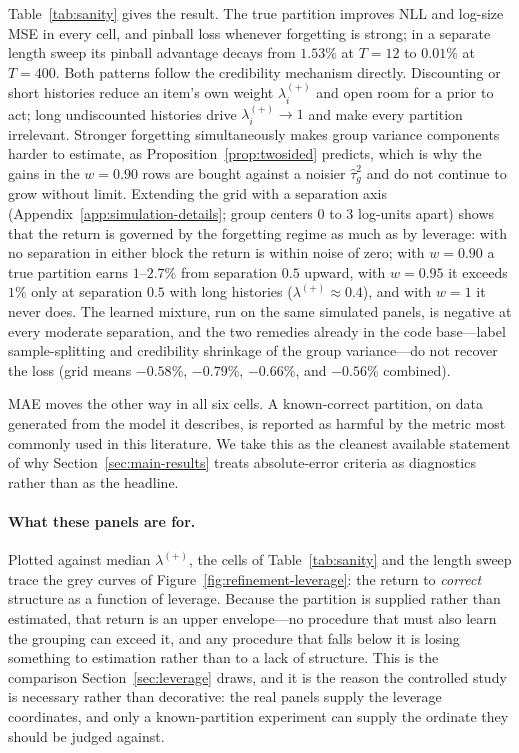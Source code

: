 Table~\ref{tab:sanity} gives the result. The true partition improves NLL
and log-size MSE in every cell, and pinball loss whenever forgetting is
strong; in a separate length sweep its pinball advantage decays from
$1.53\%$ at $T=12$ to $0.01\%$ at $T=400$. Both patterns follow the
credibility mechanism directly. Discounting or short histories reduce an
item's own weight $\lambda^{(+)}_i$ and open room for a prior to act;
long undiscounted histories drive $\lambda^{(+)}_i\to1$ and make every
partition irrelevant. Stronger forgetting simultaneously makes group
variance components harder to estimate, as
Proposition~\ref{prop:twosided} predicts, which is why the gains in the
$w=0.90$ rows are bought against a noisier $\hat\tau_g^2$ and do not
continue to grow without limit. Extending the grid with a separation axis
(Appendix~\ref{app:simulation-details}; group centers $0$ to $3$
log-units apart) shows that the return is governed by the forgetting
regime as much as by leverage: with no separation in either block the return is within noise of
zero; with $w=0.90$ a true partition earns $1$--$2.7\%$ from separation
$0.5$ upward, with $w=0.95$ it exceeds $1\%$ only at separation $0.5$
with long histories ($\lambda^{(+)}\approx0.4$), and with $w=1$ it never
does. The learned mixture, run on the same simulated panels, is negative
at every moderate separation, and the two remedies already in the code
base---label sample-splitting and credibility shrinkage of the group
variance---do not recover the loss (grid means $-0.58\%$, $-0.79\%$, $-0.66\%$, and $-0.56\%$ combined).

MAE moves the other way in all six cells. A known-correct partition, on
data generated from the model it describes, is reported as harmful by the
metric most commonly used in this literature. We take this as the cleanest
available statement of why Section~\ref{sec:main-results} treats
absolute-error criteria as diagnostics rather than as the headline.

\paragraph{What these panels are for.}
Plotted against median $\lambda^{(+)}$, the cells of
Table~\ref{tab:sanity} and the length sweep trace the grey curves of
Figure~\ref{fig:refinement-leverage}: the return to \emph{correct}
structure as a function of leverage. Because the partition is supplied
rather than estimated, that return is an upper envelope---no procedure
that must also learn the grouping can exceed it, and any procedure that
falls below it is losing something to estimation rather than to a lack of
structure. This is the comparison Section~\ref{sec:leverage} draws, and it
is the reason the controlled study is necessary rather than decorative:
the real panels supply the leverage coordinates, and only a known-partition
experiment can supply the ordinate they should be judged against.

